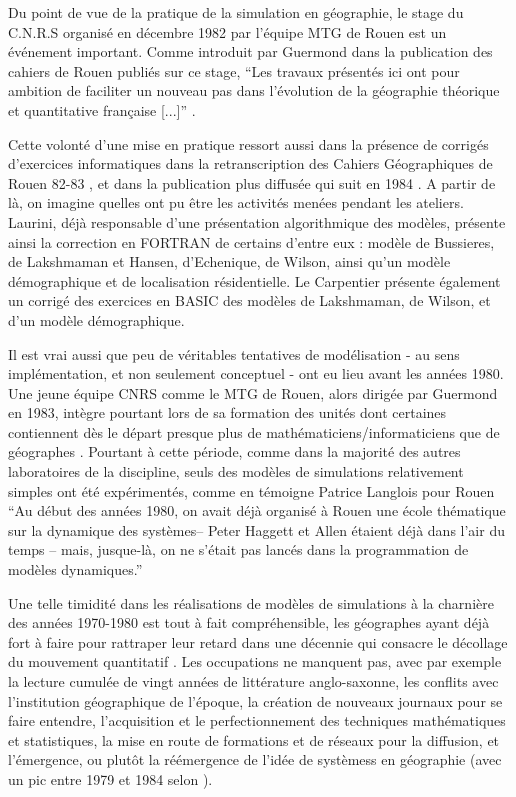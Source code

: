 Du point de vue de la pratique de la simulation en géographie, le stage du C.N.R.S organisé en décembre 1982 par l'équipe MTG de Rouen est un événement important. Comme introduit par Guermond dans la publication des cahiers de Rouen publiés sur ce stage, \enquote{Les travaux présentés ici ont pour ambition de faciliter un nouveau pas dans l'évolution de la géographie théorique et quantitative française [...]} \autocite{Guermond1983}.

Cette volonté d'une mise en pratique ressort aussi dans la présence de corrigés d'exercices informatiques dans la retranscription des Cahiers Géographiques de Rouen 82-83 \autocite{CGR1983}, et dans la publication plus diffusée qui suit en 1984 \autocite{Guermond1984}. A partir de là, on imagine quelles ont pu être les activités menées pendant les ateliers. Laurini, déjà responsable d'une présentation algorithmique des modèles, présente ainsi la correction en FORTRAN de certains d'entre eux : modèle de Bussieres, de Lakshmaman et Hansen, d'Echenique, de Wilson, ainsi qu'un modèle démographique et de localisation résidentielle. Le Carpentier présente également un corrigé des exercices en BASIC des modèles de Lakshmaman, de Wilson, et d'un modèle démographique.

Il est vrai aussi que peu de véritables tentatives de modélisation - au sens implémentation, et non seulement conceptuel - ont eu lieu avant les années 1980. Une jeune équipe CNRS comme le MTG de Rouen, alors dirigée par Guermond en 1983, intègre pourtant lors de sa formation des unités dont certaines contiennent dès le départ presque plus de mathématiciens/informaticiens que de géographes . Pourtant à cette période, comme dans la majorité des autres laboratoires de la discipline, seuls des modèles de simulations relativement simples ont été expérimentés, comme en témoigne Patrice Langlois pour Rouen \enquote{Au début des années 1980, on avait déjà organisé à Rouen une école thématique sur la dynamique des systèmes– Peter Haggett et Allen étaient déjà dans l’air du temps – mais, jusque-là, on ne s’était pas lancés dans la programmation de modèles dynamiques.} \autocite{Mathieu2014} 

Une telle timidité dans les réalisations de modèles de simulations à la charnière des années 1970-1980 est tout à fait compréhensible, les géographes ayant déjà fort à faire pour rattraper leur retard dans une décennie qui consacre le décollage du mouvement quantitatif \autocites{Cuyala2014, Orain2009}. Les occupations ne manquent pas, avec par exemple la lecture cumulée de vingt années de littérature anglo-saxonne, les conflits avec l'institution géographique de l'époque, la création de nouveaux journaux pour se faire entendre, l'acquisition et le perfectionnement des techniques mathématiques et statistiques, la mise en route de formations et de réseaux pour la diffusion, et l'émergence, ou plutôt la réémergence de l'idée de systèmess en géographie (avec un pic entre 1979 et 1984 selon \textcite{Orain2001}).

